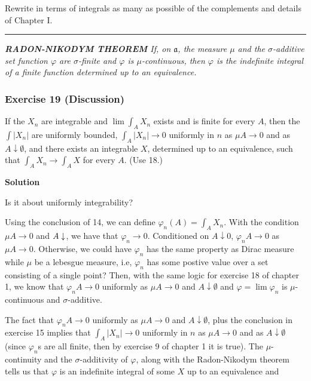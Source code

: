 \documentclass[
]{article}
\begin{document}
Rewrite in terms of integrals as many as possible of the complements and
details of Chapter I.

\begin{center}\rule{0.5\linewidth}{0.5pt}\end{center}

\emph{\textbf{RADON-NIKODYM THEOREM} If, on \(\mathfrak a\), the measure
  \(\mu\) and the \(\sigma\)-additive set function \(\varphi\) are
  \(\sigma\)-finite and \(\varphi\) is \(\mu\)-continuous, then
  \(\varphi\) is the indefinite integral of a finite function determined
  up to an equivalence.}

\hypertarget{exercise-19-discussion}{%
  \subsubsection{Exercise 19 (Discussion)}\label{exercise-19-discussion}}

If the \(X_n\) are integrable and \(\lim \int_A X_n\) exists and is
finite for every \(A\), then the \(\int\left|X_n\right|\) are uniformly
bounded, \(\int_A\left|X_n\right| \rightarrow 0\) uniformly in \(n\) as
\(\mu A \rightarrow 0\) and as \(A \downarrow \emptyset\), and there
exists an integrable \(X\), determined up to an equivalence, such that
\(\int_A X_n \rightarrow \int_A X\) for every \(A\). (Use 18.)

\textbf{Solution}

Is it about uniformly integrability?

Using the conclusion of 14, we can define \(\varphi_n(A) = \int_A X_n\).
With the condition \(\mu A \to 0\) and \(A \downarrow \empty\), we have
that \(\varphi_n \to 0\). Conditioned on \(A\downarrow 0\),
\(\varphi_n A \to 0\) as \(\mu A \to 0\). Otherwise, we could have
\(\varphi_n\) has the same property as Dirac measure while \(\mu\) be a
lebesgue measure, i.e, \(\varphi_n\) has some postive value over a set
consisting of a single point? Then, with the same logic for exercise 18
of chapter 1, we know that \(\varphi_n A \to 0\) uniformly as
\(\mu A \to 0\) and \(A \downarrow \emptyset\) and
\(\varphi = \lim \varphi_n\) is \(\mu\)-continuous and
\(\sigma\)-additive.

The fact that \(\varphi_n A \to 0\) uniformly as \(\mu A \to 0\) and
\(A \downarrow \emptyset\), plus the conclusion in exercise 15 implies
that \(\int_A\left|X_n\right| \rightarrow 0\) uniformly in \(n\) as
\(\mu A \rightarrow 0\) and as \(A \downarrow \emptyset\) (since
\(\varphi_n\)\textquotesingle s are all finite, then by exercise 9 of
chapter 1 it is true). The \(\mu\)-continuity and the
\(\sigma\)-additivity of \(\varphi\), along with the Radon-Nikodym
theorem tells us that \(\varphi\) is an indefinite integral of some
\(X\) up to an equivalence and
\end{document}
